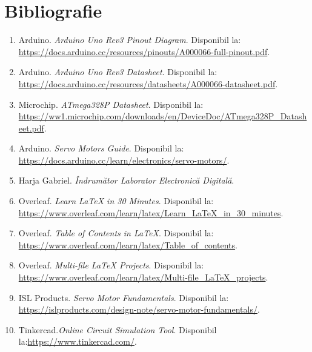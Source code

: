 \chapter{Bibliografie}

\begin{enumerate}
    \item Arduino. \textit{Arduino Uno Rev3 Pinout Diagram}. %
    Disponibil la: \url{https://docs.arduino.cc/resources/pinouts/A000066-full-pinout.pdf}.

    \item Arduino. \textit{Arduino Uno Rev3 Datasheet}. %
    Disponibil la: \url{https://docs.arduino.cc/resources/datasheets/A000066-datasheet.pdf}.

    \item Microchip. \textit{ATmega328P Datasheet}. %
    Disponibil la: %
    \url{https://ww1.microchip.com/downloads/en/DeviceDoc/ATmega328P_Datasheet.pdf}.

    \item Arduino. \textit{Servo Motors Guide}. %
    Disponibil la: \url{https://docs.arduino.cc/learn/electronics/servo-motors/}.

    \item Harja Gabriel. \textit{Îndrumător Laborator Electronică Digitală}.  

    \item Overleaf. \textit{Learn LaTeX in 30 Minutes}. %
    Disponibil la: \url{https://www.overleaf.com/learn/latex/Learn_LaTeX_in_30_minutes}.

    \item Overleaf. \textit{Table of Contents in LaTeX}. %
    Disponibil la: \url{https://www.overleaf.com/learn/latex/Table_of_contents}.

    \item Overleaf. \textit{Multi-file LaTeX Projects}. %
    Disponibil la: \url{https://www.overleaf.com/learn/latex/Multi-file_LaTeX_projects}.

    \item ISL Products. \textit{Servo Motor Fundamentals}. %
    Disponibil la: \url{https://islproducts.com/design-note/servo-motor-fundamentals/}.

    \item Tinkercad.\textit{Online Circuit Simulation Tool}. %
    Disponibil la:\url{https://www.tinkercad.com/}.
\end{enumerate}
